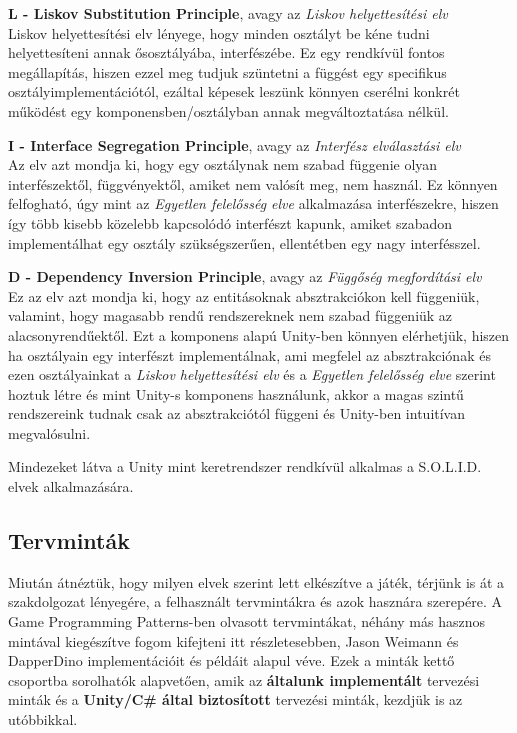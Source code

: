 \textbf{L - Liskov Substitution Principle}, avagy az \textit{Liskov helyettesítési elv}\\
Liskov helyettesítési elv lényege, hogy minden osztályt be kéne tudni helyettesíteni annak ősosztályába, interfészébe. Ez egy rendkívül fontos megállapítás, hiszen ezzel meg tudjuk szüntetni a függést egy specifikus osztályimplementációtól, ezáltal képesek leszünk könnyen cserélni konkrét működést egy komponensben/osztályban annak megváltoztatása nélkül.

\textbf{I - Interface Segregation Principle}, avagy az \textit{Interfész elválasztási elv}\\
Az elv azt mondja ki, hogy egy osztálynak nem szabad függenie olyan interfészektől, függvényektől, amiket nem valósít meg, nem használ. Ez könnyen felfogható, úgy mint az \textit{Egyetlen felelősség elve} alkalmazása interfészekre, hiszen így több kisebb közelebb kapcsolódó interfészt kapunk, amiket szabadon implementálhat egy osztály szükségszerűen, ellentétben egy nagy interfésszel.

\textbf{D - Dependency Inversion Principle}, avagy az \textit{Függőség megfordítási elv}\\
Ez az elv azt mondja ki, hogy az entitásoknak absztrakciókon kell függeniük, valamint, hogy magasabb rendű rendszereknek nem szabad függeniük az alacsonyrendűektől. Ezt a komponens alapú Unity-ben könnyen elérhetjük, hiszen ha osztályain egy interfészt implementálnak, ami megfelel az absztrakciónak és ezen osztályainkat a \textit{Liskov helyettesítési elv} és a \textit{Egyetlen felelősség elve} szerint hoztuk létre és mint Unity-s komponens használunk, akkor a magas szintű rendszereink tudnak csak az absztrakciótól függeni és Unity-ben intuitívan megvalósulni.

Mindezeket látva a Unity mint keretrendszer rendkívül alkalmas a S.O.L.I.D. elvek alkalmazására.

\subsection{Tervminták}
Miután átnéztük, hogy milyen elvek szerint lett elkészítve a játék, térjünk is át a szakdolgozat lényegére, a felhasznált tervmintákra és azok hasznára szerepére. A Game Programming Patterns-ben\cite{gameProgrammingPatterns} olvasott tervmintákat, néhány más hasznos mintával kiegészítve fogom kifejteni itt részletesebben, Jason Weimann\cite{jason} és DapperDino\cite{dapperDino} implementációit és példáit alapul véve. Ezek a minták kettő csoportba sorolhatók alapvetően, amik az \textbf{általunk implementált} tervezési minták és a \textbf{Unity/C\# által biztosított} tervezési minták, kezdjük is az utóbbikkal.

